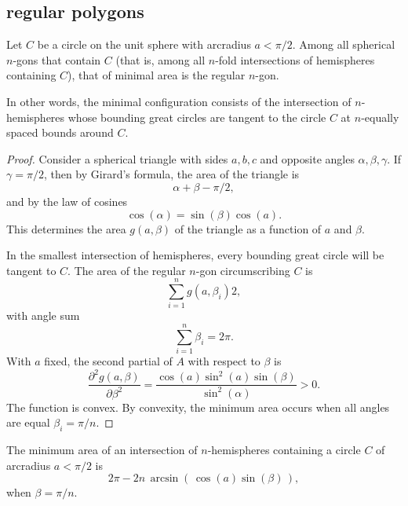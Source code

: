 \subsection{regular polygons}
%
%

\begin{lemma}\label{lemma:ngon}
Let $C$ be a circle on the unit sphere with arcradius $a<\pi/2$.  Among all spherical $n$-gons that
contain $C$  (that is, among all $n$-fold intersections of hemispheres containing $C$), that of minimal area is the regular $n$-gon.  
\end{lemma}

In other words, the minimal configuration consists of the intersection of $n$-hemispheres whose bounding great circles are tangent to the circle $C$ at $n$-equally spaced bounds around $C$.

\begin{proof} 
Consider a spherical triangle with sides $a,b,c$ and opposite angles $\alpha,\beta,\gamma$.  If $\gamma=\pi/2$, then by Girard's formula, the area
of the triangle is
$$
\alpha+\beta-\pi/2,
$$
and by the law of cosines 
$$
\cos(\alpha) =\sin(\beta)\cos(a).
$$
This determines the area $g(a,\beta)$ of the triangle 
as a function of $a$ and $\beta$.
%
%
%
%
%

In the smallest intersection of hemispheres,  every bounding great circle will be tangent to $C$.
The area of the regular $n$-gon circumscribing $C$ is
$$
\sum_{i=1}^n g(a,\beta_i) 2,
$$
with angle sum
$$
\sum_{i=1}^n \beta_i = 2\pi.
$$
With  $a$ fixed, the second partial of $A$ with respect to $\beta$ is
$$
\frac{\partial^2 g(a,\beta)}{\partial \beta^2} = \frac{\cos(a)\sin^2(a)\sin(\beta)}{\sin^2(\alpha)} > 0.
$$
The function is convex.
By convexity, the minimum area occurs when all angles are equal
$\beta_i = \pi/n$.
\end{proof}
%

\begin{lemma}\label{lemma:ngon-area}
The minimum area of an intersection of $n$-hemispheres containing a circle $C$ 
of arcradius $a<\pi/2$ is
$$
2\pi - 2 n \,\arcsin\left(\,\cos(a)\sin(\beta)\,\right),
$$
when $\beta = \pi/n$.
\end{lemma}

